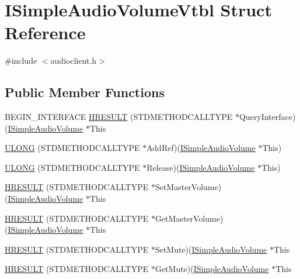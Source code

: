 \hypertarget{struct_i_simple_audio_volume_vtbl}{}\section{I\+Simple\+Audio\+Volume\+Vtbl Struct Reference}
\label{struct_i_simple_audio_volume_vtbl}


{\ttfamily \#include $<$audioclient.\+h$>$}

\subsection*{Public Member Functions}
\begin{DoxyCompactItemize}
\item 
B\+E\+G\+I\+N\+\_\+\+I\+N\+T\+E\+R\+F\+A\+CE \hyperlink{struct_i_simple_audio_volume_vtbl_a16cf9f441ed8b35af617071cb6d619f7}{H\+R\+E\+S\+U\+LT} (S\+T\+D\+M\+E\+T\+H\+O\+D\+C\+A\+L\+L\+T\+Y\+PE $\ast$Query\+Interface)(\hyperlink{audioclient_8h_aa027700db2186e704eaf5b1e583d907c}{I\+Simple\+Audio\+Volume} $\ast$This
\item 
\hyperlink{struct_i_simple_audio_volume_vtbl_af6e622d5bb8861e1c203ff3d138f8cd0}{U\+L\+O\+NG} (S\+T\+D\+M\+E\+T\+H\+O\+D\+C\+A\+L\+L\+T\+Y\+PE $\ast$Add\+Ref)(\hyperlink{audioclient_8h_aa027700db2186e704eaf5b1e583d907c}{I\+Simple\+Audio\+Volume} $\ast$This)
\item 
\hyperlink{struct_i_simple_audio_volume_vtbl_aac9857f7115bb6e70a98279902d43acb}{U\+L\+O\+NG} (S\+T\+D\+M\+E\+T\+H\+O\+D\+C\+A\+L\+L\+T\+Y\+PE $\ast$Release)(\hyperlink{audioclient_8h_aa027700db2186e704eaf5b1e583d907c}{I\+Simple\+Audio\+Volume} $\ast$This)
\item 
\hyperlink{struct_i_simple_audio_volume_vtbl_aef9d404b160d05b0794cbdca203e7cab}{H\+R\+E\+S\+U\+LT} (S\+T\+D\+M\+E\+T\+H\+O\+D\+C\+A\+L\+L\+T\+Y\+PE $\ast$Set\+Master\+Volume)(\hyperlink{audioclient_8h_aa027700db2186e704eaf5b1e583d907c}{I\+Simple\+Audio\+Volume} $\ast$This
\item 
\hyperlink{struct_i_simple_audio_volume_vtbl_a11db593063b045ef0620f8388317c410}{H\+R\+E\+S\+U\+LT} (S\+T\+D\+M\+E\+T\+H\+O\+D\+C\+A\+L\+L\+T\+Y\+PE $\ast$Get\+Master\+Volume)(\hyperlink{audioclient_8h_aa027700db2186e704eaf5b1e583d907c}{I\+Simple\+Audio\+Volume} $\ast$This
\item 
\hyperlink{struct_i_simple_audio_volume_vtbl_a86f92477da980e5d73917865db684ee5}{H\+R\+E\+S\+U\+LT} (S\+T\+D\+M\+E\+T\+H\+O\+D\+C\+A\+L\+L\+T\+Y\+PE $\ast$Set\+Mute)(\hyperlink{audioclient_8h_aa027700db2186e704eaf5b1e583d907c}{I\+Simple\+Audio\+Volume} $\ast$This
\item 
\hyperlink{struct_i_simple_audio_volume_vtbl_acf16ea486050c2dc6df9a481713c0ee2}{H\+R\+E\+S\+U\+LT} (S\+T\+D\+M\+E\+T\+H\+O\+D\+C\+A\+L\+L\+T\+Y\+PE $\ast$Get\+Mute)(\hyperlink{audioclient_8h_aa027700db2186e704eaf5b1e583d907c}{I\+Simple\+Audio\+Volume} $\ast$This
\end{DoxyCompactItemize}
